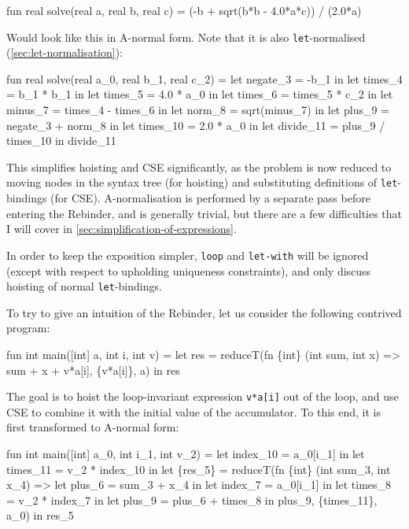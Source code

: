 \begin{colorcode}
fun real solve(real a, real b, real c) =
  (-b + sqrt(b*b - 4.0*a*c)) / (2.0*a)
\end{colorcode}

Would look like this in A-normal form.  Note that it is also
\texttt{let}-normalised (\cref{sec:let-normalisation}):

\begin{colorcode}
fun real solve(real a_0, real b_1, real c_2) =
  let negate_3  = -b_1 in
  let times_4   = b_1 * b_1 in
  let times_5   = 4.0 * a_0 in
  let times_6   = times_5 * c_2 in
  let minus_7   = times_4 - times_6 in
  let norm_8    = sqrt(minus_7) in
  let plus_9    = negate_3 + norm_8 in
  let times_10  = 2.0 * a_0 in
  let divide_11 = plus_9 / times_10 in
  divide_11
\end{colorcode}

This simplifies hoisting and CSE significantly, as the problem is now
reduced to moving nodes in the syntax tree (for hoisting) and
substituting definitions of \texttt{let}-bindings (for CSE).
A-normalisation is performed by a separate pass before entering the
Rebinder, and is generally trivial, but there are a few difficulties
that I will cover in \cref{sec:simplification-of-expressions}.

In order to keep the exposition simpler, \texttt{loop} and
\texttt{let-with} will be ignored (except with respect to upholding
uniqueness constraints), and only discuss hoisting of normal
\texttt{let}-bindings.

To try to give an intuition of the Rebinder, let us consider the
following contrived program:

\begin{colorcode}
fun int main([int] a, int i, int v) =
  let {res} =
    reduceT(fn \{int\} (int sum, int x) =>
              {sum + x + v*a[i]},
            \{v*a[i]\}, a) in
  res
\end{colorcode}

The goal is to hoist the loop-invariant expression \texttt{v*a[i]} out
of the loop, and use CSE to combine it with the initial value of the
accumulator.  To this end, it is first transformed to A-normal form:

\begin{colorcode}
fun int main([int] a_0, int i_1, int v_2) =
  let index_10 = a_0[i_1] in
  let times_11 = v_2 * index_10 in
  let \{res_5\} =
    reduceT(fn \{int\} (int sum_3, int x_4) =>
              let plus_6 = sum_3 + x_4 in
              let index_7 = a_0[i_1] in
              let times_8 = v_2 * index_7 in
              let plus_9 = plus_6 + times_8 in
              {plus_9},
            \{times_11\}, a_0) in
  res_5
\end{colorcode}

